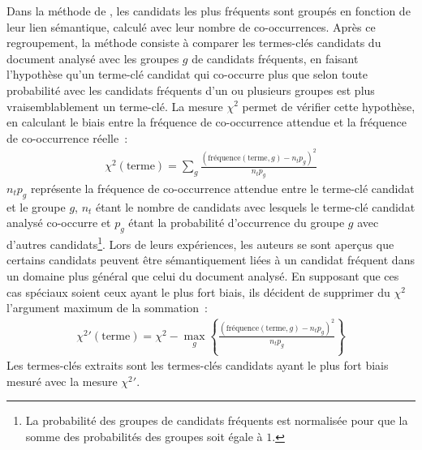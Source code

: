         Dans la méthode de , les candidats
        les plus fréquents sont groupés en fonction de leur lien sémantique,
        calculé avec leur nombre de co-occurrences. Après ce regroupement, la
        méthode consiste à comparer les termes-clés candidats du document
        analysé avec les groupes $g$ de candidats fréquents, en faisant
        l'hypothèse qu'un terme-clé candidat qui co-occurre plus que selon
        toute probabilité avec les candidats fréquents d'un ou plusieurs
        groupes est plus vraisemblablement un terme-clé. La mesure $\chi^2$
        permet de vérifier cette hypothèse, en calculant le biais entre la
        fréquence de co-occurrence attendue et la fréquence de co-occurrence
        réelle~:
        \begin{align}
          \chi^2(\text{terme}) = \sum_{g} \frac{(\text{fréquence}(\text{terme}, g) - n_tp_g)^2}{n_tp_g}
        \end{align}
        $n_tp_g$ représente la fréquence de co-occurrence attendue entre le
        terme-clé candidat et le groupe $g$, $n_t$ étant le nombre de
        candidats avec lesquels le terme-clé candidat analysé co-occurre et
        $p_g$ étant la probabilité d'occurrence du groupe $g$ avec d'autres
        candidats\footnote{La probabilité des groupes de candidats fréquents
        est normalisée pour que la somme des probabilités des groupes soit
        égale à $1$.}. Lors de leurs expériences, les auteurs se sont aperçus
        que certains candidats peuvent être sémantiquement liées à un
        candidat fréquent dans un domaine plus général que celui du document
        analysé. En supposant que ces cas spéciaux soient ceux ayant le plus
        fort biais, ils décident de supprimer du $\chi^2$ l'argument maximum
        de la sommation~:
        \begin{align}
          \chi^2{'}(\text{terme}) = \chi^2 - \max_{g}\left\{\frac{(\text{fréquence}(\text{terme}, g) - n_tp_g)^2}{n_tp_g}\right\}
        \end{align}
        Les termes-clés extraits sont les termes-clés candidats ayant le plus
        fort biais mesuré avec la mesure $\chi^2{'}$.

